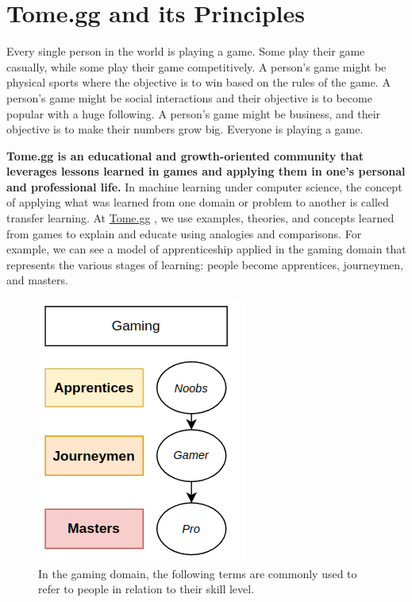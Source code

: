 \documentclass[conference]{IEEEtran}
\newcommand{\tomegg}{
  \href{http://tome.gg}{Tome.gg}
}
\begin{document}
\section{Tome.gg and its Principles}
\label{sec:tomegg}
Every single person in the world is playing a game. Some play their game casually,
while some play their game competitively. A person's game might be physical sports
where the objective is to win based on the rules of the game. A person's game
might be social interactions and their objective is to become popular with a huge 
following. A person's game might be business, and their objective is to make their 
numbers grow big. Everyone is playing a game.

  \textbf{Tome.gg is an educational and growth-oriented community that leverages
  lessons learned in games and applying them in one's personal and professional life.} 
  In machine learning under computer science, the concept of applying what was 
  learned from one domain or problem to another is called transfer learning\cite{b5}.
  At \tomegg, we use examples, theories, and concepts learned from games to explain
  and educate using analogies and comparisons. 
  For example, we can see a model of apprenticeship\cite{b4} applied in the gaming domain
  that represents the various stages of learning: people become apprentices, 
  journeymen, and masters.

\begin{figure}[t]
  \includegraphics[scale=0.7]{stakeholders-gaming}
  \centering
  \caption{In the gaming domain, the following terms are commonly used to refer 
  to people in relation to their skill level.}
  \label{fig:stakeholders-gaming} 
\end{figure}
\end{document}
